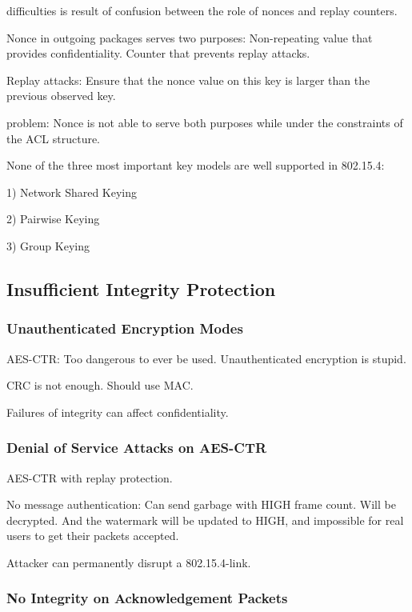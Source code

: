 \documentclass[10pt]{article}
\begin{document}
difficulties is result of confusion between the role of nonces and replay counters.

Nonce in outgoing packages serves two purposes: Non-repeating value that provides confidentiality. Counter that prevents replay attacks.

Replay attacks: Ensure that the nonce value on this key is larger than the previous observed key. 

problem: Nonce is not able to serve both purposes while under the constraints of the ACL structure.



None of the three most important key models are well supported in 802.15.4:

1) Network Shared Keying

2) Pairwise Keying

3) Group Keying


\subsection{Insufficient Integrity Protection}


\subsubsection{Unauthenticated Encryption Modes}

AES-CTR: Too dangerous to ever be used. Unauthenticated encryption is stupid.

CRC is not enough. Should use MAC.

Failures of integrity can affect confidentiality. 


\subsubsection{Denial of Service Attacks on AES-CTR}

AES-CTR with replay protection.

No message authentication: Can send garbage with HIGH frame count. Will be decrypted. And the watermark will be updated to HIGH, and impossible for real users to get their packets accepted.

Attacker can permanently disrupt a 802.15.4-link.



\subsubsection{No Integrity on Acknowledgement Packets}
\end{document}
